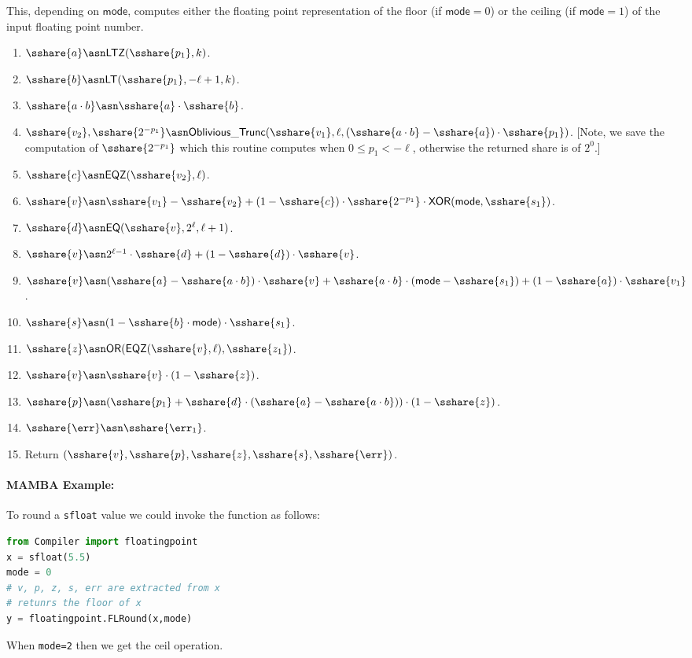 This, depending on $\mathsf{mode}$, computes either the floating point
representation of the floor (if $\mathsf{mode}=0$) or the ceiling (if $\mathsf{mode}=1$)
of the input floating point number.
\begin{enumerate}
\item $\sshare{a} \asn \mathsf{LTZ}(\sshare{p_1},k)$.
\item $\sshare{b} \asn \mathsf{LT}(\sshare{p_1},-\ell+1,k)$.
\item $\sshare{a \cdot b} \asn \sshare{a} \cdot \sshare{b}$.
\item $\sshare{v_2},\sshare{2^{-p_1}} \asn \mathsf{Oblivious\_Trunc}(\sshare{v_1},\ell,(\sshare{a \cdot b}-\sshare{a}) \cdot \sshare{p_1})$. 
	[Note, we save the computation of $\sshare{2^{-p_1}}$ which this routine computes when $0 \le p_1 < -\ell$, otherwise the returned share is of $2^0$.]
\item $\sshare{c} \asn \mathsf{EQZ}(\sshare{v_2},\ell)$.
\item $\sshare{v} \asn \sshare{v_1}-\sshare{v_2}+(1-\sshare{c}) \cdot \sshare{2^{-p_1}} 
	\cdot \mathsf{XOR}(\mathsf{mode},\sshare{s_1})$.
\item $\sshare{d} \asn \mathsf{EQ}(\sshare{v},2^\ell,\ell+1)$.
\item $\sshare{v} \asn 2^{\ell-1} \cdot \sshare{d} + (1-\sshare{d}) \cdot \sshare{v}$.
\item $\sshare{v} \asn (\sshare{a}-\sshare{a \cdot b}) \cdot \sshare{v}
			+ \sshare{a \cdot b} \cdot (\mathsf{mode}-\sshare{s_1})
					+ (1-\sshare{a}) \cdot \sshare{v_1}$.
\item $\sshare{s} \asn (1-\sshare{b} \cdot \mathsf{mode}) \cdot \sshare{s_1}$.
\item $\sshare{z} \asn \mathsf{OR}(\mathsf{EQZ}(\sshare{v},\ell),\sshare{z_1})$.
\item $\sshare{v} \asn \sshare{v} \cdot (1-\sshare{z})$.
\item $\sshare{p} \asn (\sshare{p_1}+\sshare{d} \cdot (\sshare{a}-\sshare{a \cdot b})) \cdot (1-\sshare{z})$.
\item $\sshare{\err} \asn \sshare{\err_1}$.
\item Return $(\sshare{v},\sshare{p},\sshare{z},\sshare{s},\sshare{\err})$.
\end{enumerate}

\paragraph{MAMBA Example:} To round a \verb|sfloat| value we could invoke the function as follows: 
\begin{lstlisting}[language={python}]
from Compiler import floatingpoint
x = sfloat(5.5)
mode = 0 
# v, p, z, s, err are extracted from x
# retunrs the floor of x
y = floatingpoint.FLRound(x,mode)
\end{lstlisting}
When \verb+mode=2+ then we get the ceil operation.


